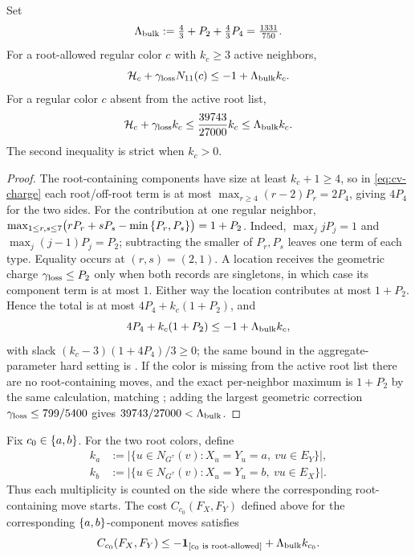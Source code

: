 \begin{lemma}\label{lem:cv-high}
Set
\[
 \Lambda_{\rm bulk}:=\tfrac43+P_2+\tfrac43P_4=\tfrac{1331}{750}.
\]
For a root-allowed regular color \(c\) with $k_c\ge3$ active neighbors,
\[
 \mathcal H_c+\gamma_{\rm loss}N_{11}(c)
 \le-1+\Lambda_{\rm bulk}k_c.
\]
For a regular color \(c\) absent from the active root list,
\[
 \mathcal H_c+\gamma_{\rm loss}k_c
 \le \frac{39743}{27000}k_c\le\Lambda_{\rm bulk}k_c.
\]
The second inequality is strict when $k_c>0$.
\end{lemma}

\begin{proof}
The root-containing components have size at least $k_c+1\ge4$, so in
\eqref{eq:cv-charge} each root/off-root term is at most
\(\max_{r\ge4}(r-2)P_r=2P_4\), giving \(4P_4\) for the two sides. For the
contribution at one regular neighbor,
\(\max_{1\le r,s\le7}
  \bigl(rP_r+sP_s-\min\left\{P_r,P_s\right\}\bigr)=1+P_2\).
Indeed, $\max_j jP_j=1$ and $\max_j(j-1)P_j=P_2$; subtracting the smaller
of \(P_r,P_s\) leaves one term of each type.  Equality occurs at
\((r,s)=(2,1)\).  A location receives the geometric charge
$\gamma_{\rm loss}\le P_2$ only when both records are singletons, in
which case its component term is at most $1$. Either way the location
contributes at most $1+P_2$. Hence the total is at most
$4P_4+k_c(1+P_2)$, and
\[
 4P_4+k_c(1+P_2)\le-1+\Lambda_{\rm bulk}k_c,
\]
with slack $(k_c-3)(1+4P_4)/3\ge0$; the
same bound in the aggregate-parameter hard setting is
\cite[Lemma~4.6]{CarlsonVigoda2024}. If the color is missing from the
active root list there are no root-containing moves, and the exact
per-neighbor maximum is $1+P_2$ by the same calculation, matching
\cite[Lemma~4.7]{CarlsonVigoda2024}; adding the largest geometric
correction $\gamma_{\rm loss}\le799/5400$ gives
$39743/27000<\Lambda_{\rm bulk}$.
\end{proof}

\begin{lemma}\label{lem:cv-special}
Fix $c_0\in\left\{a,b\right\}$.  For the two root colors, define
\[
\begin{aligned}
 k_a&:=\bigl|\{u\in N_{G^\tau}(v):X_u=Y_u=a,\ vu\in E_Y\}\bigr|,\\
 k_b&:=\bigl|\{u\in N_{G^\tau}(v):X_u=Y_u=b,\ vu\in E_X\}\bigr|.
\end{aligned}
\]
Thus each multiplicity is counted on the side where the corresponding
root-containing move starts.  The cost \(C_{c_0}(F_X,F_Y)\) defined above for the corresponding
$\left\{a,b\right\}$-component moves satisfies
\[
 C_{c_0}(F_X,F_Y)\le-\mathbf{1}_{\left[c_0\text{ is root-allowed}\right]}
              +\Lambda_{\rm bulk}k_{c_0}.
\]
\end{lemma}

